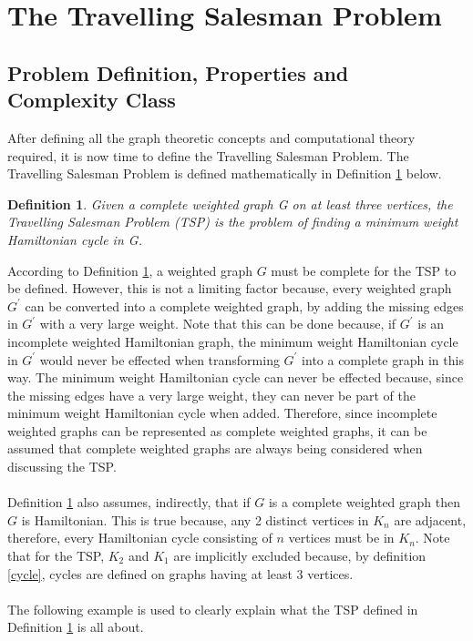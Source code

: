 \documentclass[12pt]{article}
\newtheorem{definition}{Definition}[subsection]
\numberwithin{equation}{subsection}
\numberwithin{table}{subsection}
\begin{document}
\section{The Travelling Salesman Problem}
\subsection{Problem Definition, Properties and Complexity Class}
After defining all the graph theoretic concepts and computational theory required, it is now time to define the Travelling Salesman Problem. The Travelling Salesman Problem is defined mathematically in Definition \ref{TSP} below.
\begin{definition}
\label{TSP}
Given a complete weighted graph G on at least three vertices, the Travelling Salesman Problem (TSP) is the problem of finding a minimum weight Hamiltonian cycle in G. {}
\end{definition}
According to Definition \ref{TSP}, a weighted graph $\mathit{G}$ must be complete for the TSP to be defined. However, this is not a limiting factor because, every weighted graph $\mathit{G^\prime}$ can be converted into a complete weighted graph, by adding the missing edges in $\mathit{G^\prime}$ with a very large weight. Note that this can be done because, if $\mathit{G^\prime}$ is an incomplete weighted Hamiltonian graph, the minimum weight Hamiltonian cycle in $\mathit{G^\prime}$ would never be effected when transforming $\mathit{G^\prime}$ into a complete graph in this way. The minimum weight Hamiltonian cycle can never be effected because, since the missing edges have a very large weight, they can never be part of the minimum weight Hamiltonian cycle when added. Therefore, since incomplete weighted graphs can be represented as complete weighted graphs, it can be assumed that complete weighted graphs are always being considered when discussing the TSP.\\\\
Definition \ref{TSP} also assumes, indirectly, that if $\mathit{G}$ is a complete weighted graph then $\mathit{G}$ is Hamiltonian. This is true because, any 2 distinct vertices in $K_n$ are adjacent, therefore, every Hamiltonian cycle consisting of $n$ vertices must be in $K_n$. Note that for the TSP, $K_2$ and $K_1$ are implicitly excluded because, by definition \ref{cycle}, cycles are defined on graphs having at least 3 vertices.\\ 
\\
The following example is used to clearly explain what the TSP defined in Definition \ref{TSP} is all about.
\end{document}
